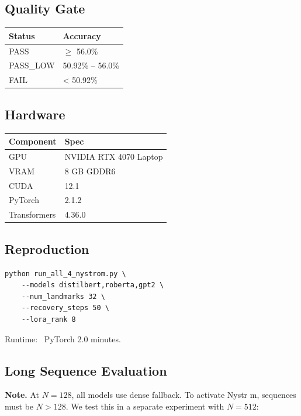 \subsection{Quality Gate}

\begin{table}[H]
\centering
\small
\begin{tabular}{ll}
\toprule
\textbf{Status} & \textbf{Accuracy} \\
\midrule
PASS & $\ge$ 56.0\% \\
PASS\_LOW & 50.92\% -- 56.0\% \\
FAIL & < 50.92\% \\
\bottomrule
\end{tabular}
\end{table}

\subsection{Hardware}

\begin{table}[H]
\centering
\small
\begin{tabular}{ll}
\toprule
\textbf{Component} & \textbf{Spec} \\
\midrule
GPU & NVIDIA RTX 4070 Laptop \\
VRAM & 8 GB GDDR6 \\
CUDA & 12.1 \\
PyTorch & 2.1.2 \\
Transformers & 4.36.0 \\
\bottomrule
\end{tabular}
\end{table}

\subsection{Reproduction}

\begin{lstlisting}
python run_all_4_nystrom.py \
    --models distilbert,roberta,gpt2 \
    --num_landmarks 32 \
    --recovery_steps 50 \
    --lora_rank 8
\end{lstlisting}

Runtime: ~PyTorch 2.0 minutes.

\subsection{Long Sequence Evaluation}

\textbf{Note.} At $N = 128$, all models use dense fallback. To activate Nystr m, 
sequences must be $N > 128$. We test this in a separate experiment with 
$N = 512$:

